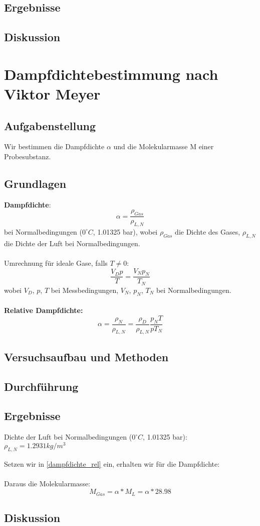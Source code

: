 \documentclass{article}
\begin{document}
\subsection{Ergebnisse}
\subsection{Diskussion}

\newpage
\section{Dampfdichtebestimmung nach Viktor Meyer}
\subsection{Aufgabenstellung}
Wir bestimmen die Dampfdichte $\alpha$ und die Molekularmasse M einer Probesubstanz. 
\subsection{Grundlagen}
\textbf{Dampfdichte}: 
\begin{equation}
\label{dampfdichte_norm}
\alpha=\frac{\rho_{Gas}}{\rho_{L,N}}
\end{equation}
bei Normalbedingungen ($0^\circ C$, 1.01325 bar), wobei $\rho_{Gas}$ die Dichte des Gases, $\rho_{L,N}$ die Dichte der Luft bei Normalbedingungen.\\
\\
Umrechnung für ideale Gase, falls $T\neq 0$:
\begin{equation}
\frac{V_Dp}{T}=\frac{V_Np_N}{T_N}
\end{equation}
wobei $V_D$, $p$, $T$ bei Messbedingungen, $V_N$, $p_N$, $T_N$ bei Normalbedingungen.\\
\\
\textbf{Relative Dampfdichte:}
\begin{equation}
\label{dampfdichte_rel}
\alpha=\frac{\rho_N}{\rho_{L,N}}=\frac{\rho_D}{\rho_{L,N}}\frac{p_NT}{pT_N}
\end{equation}

\subsection{Versuchsaufbau und Methoden}
\subsection{Durchführung}
\subsection{Ergebnisse}
Dichte der Luft bei Normalbedingungen ($0^\circ C$, 1.01325 bar):\\
$\rho_{L,N}=1.2931kg/m^3$

Setzen wir in \ref{dampfdichte_rel} ein, erhalten wir für die Dampfdichte:\\
\\
Daraus die Molekularmasse:\\
$$M_{Gas}=\alpha*M_L=\alpha*28.98$$

\subsection{Diskussion}
\end{document}
